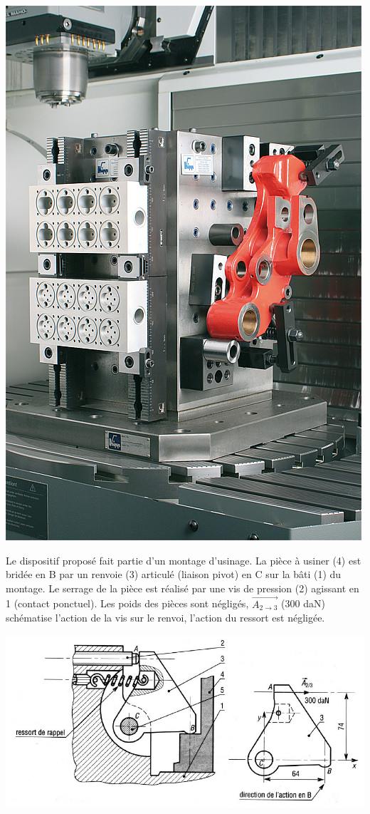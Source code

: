 \begin{minipage}{0.4\linewidth}
 \centering\includegraphics[width=0.7\linewidth]{img/KMSS.jpg}
\end{minipage}
\hfill
\begin{minipage}{0.56\linewidth}
Le dispositif proposé fait partie d'un montage d'usinage. La pièce à usiner (4) est bridée en B par un renvoie (3) articulé (liaison pivot) en C sur la bâti (1) du montage. Le serrage de la pièce est réalisé par une vis de pression (2) agissant en 1 (contact ponctuel). Les poids des pièces sont négligés, $\overrightarrow{A_{2 \rightarrow 3}}$ (300 daN) schématise l'action de la vis sur le renvoi, l'action du ressort est négligée.
\end{minipage}

\begin{center}
 \includegraphics[width=0.9\linewidth]{img/Bride.jpg}
\end{center}

